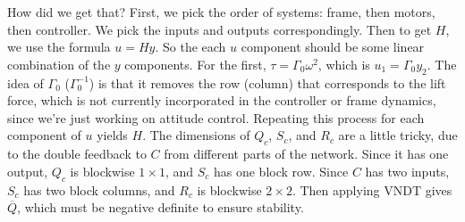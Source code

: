 \documentclass[10pt]{article}
\theoremstyle{definition}
\begin{document}
How did we get that? First, we pick the order of systems: frame, then motors, then controller. We pick the inputs and outputs correspondingly. Then to get $H$, we use the formula $u = Hy$. So the each $u$ component should be some linear combination of the $y$ components. For the first, $\tau = \Gamma_0\omega^2$, which is $u_1 = \Gamma_0y_2$. The idea of $\Gamma_0$ ($\Gamma_0^{-1}$) is that it removes the row (column) that corresponds to the lift force, which is not currently incorporated in the controller or frame dynamics, since we're just working on attitude control.  Repeating this process for each component of $u$ yields $H$. The dimensions of $Q_c$, $S_c$, and $R_c$ are a little tricky, due to the double feedback to $C$ from different parts of the network. Since it has one output, $Q_c$ is blockwise $1\times1$, and $S_c$ has one block row. Since $C$ has two inputs, $S_c$ has two block columns, and $R_c$ is blockwise $2\times 2$. Then applying VNDT gives $\overline{Q}$, which must be negative definite to ensure stability.
\end{document}
